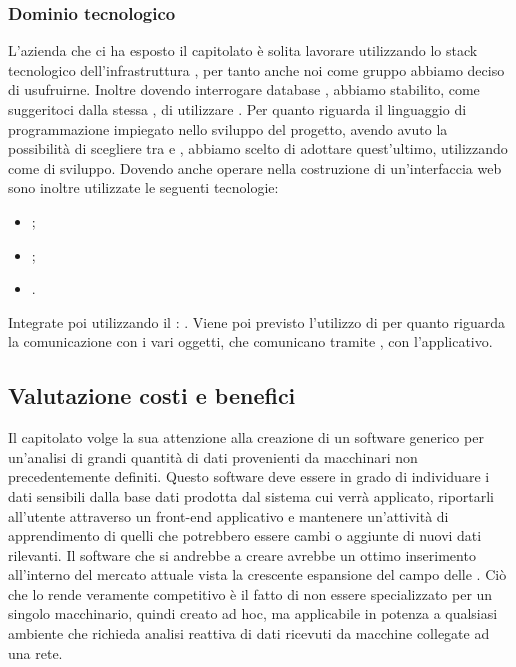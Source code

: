  
\subsubsection{Dominio tecnologico}
L'azienda \Proponente{} che ci ha esposto il capitolato \ProjectName{} \`e solita lavorare utilizzando lo stack tecnologico dell'infrastruttura , per tanto anche noi come gruppo abbiamo deciso di usufruirne.
Inoltre dovendo interrogare database , abbiamo stabilito, come suggeritoci dalla stessa \Proponente{}, di utilizzare .
Per quanto riguarda il linguaggio di programmazione impiegato nello sviluppo del progetto, avendo avuto la possibilit\`a di scegliere tra  e , abbiamo scelto di adottare quest'ultimo, utilizzando  come  di sviluppo.
Dovendo anche operare nella costruzione di un'interfaccia web sono inoltre utilizzate le seguenti tecnologie:
\begin{itemize}
	\item \textbf{};
	\item\textbf{};
	\item \textbf{}.
\end{itemize}
Integrate poi utilizzando il : .
Viene poi previsto l'utilizzo di  per quanto riguarda la comunicazione con i vari oggetti, che comunicano tramite , con l'applicativo.

\subsection{Valutazione costi e benefici}
Il capitolato volge la sua attenzione alla creazione di un software generico per un'analisi di grandi quantit\`a di dati provenienti da macchinari non precedentemente definiti. Questo software deve essere in grado di individuare i dati sensibili dalla base dati prodotta dal sistema cui verr\`a applicato, riportarli all'utente attraverso un front-end applicativo e mantenere un'attivit\`a di apprendimento di quelli che potrebbero essere cambi o aggiunte di nuovi dati rilevanti. Il software che si andrebbe a creare avrebbe un ottimo inserimento all'interno del mercato attuale vista la crescente espansione del campo delle . Ci\`o che lo rende veramente competitivo \`e il fatto di non essere specializzato per un singolo macchinario, quindi creato ad hoc, ma applicabile in potenza a qualsiasi ambiente che richieda analisi reattiva di dati ricevuti da macchine collegate ad una rete.

